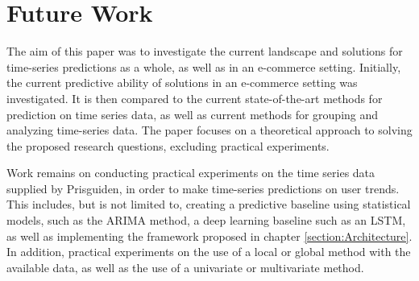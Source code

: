 
\section{Future Work}
\label{sections:Discussion:FutureWork}



% 

The aim of this paper was to investigate the current landscape and solutions for time-series predictions as a whole,
as well as in an e-commerce setting.
Initially, the current predictive ability of solutions in an e-commerce setting was investigated.
It is then compared to the current state-of-the-art methods for prediction on time series data,
as well as current methods for grouping and analyzing time-series data.
The paper focuses on a theoretical approach to solving the proposed research questions,
excluding practical experiments.

Work remains on conducting practical experiments on the time series data supplied by Prisguiden,
in order to make time-series predictions on user trends.
This includes, but is not limited to, creating a predictive baseline using statistical models, such as the ARIMA method, a deep learning baseline such as an LSTM,
as well as implementing the framework proposed in chapter \ref{section:Architecture}.
In addition, practical experiments on the use of a local or global method with the available data,
as well as the use of a univariate or multivariate method.



\iffalse
Consider where you would like to extend this work. These extensions might either be continuing the ongoing direction or taking a side direction that became obvious during the work. Further, possible solutions to limitations in the work conducted, highlighted in ~\ref{sec:Discussion} may be presented. 
\fi

